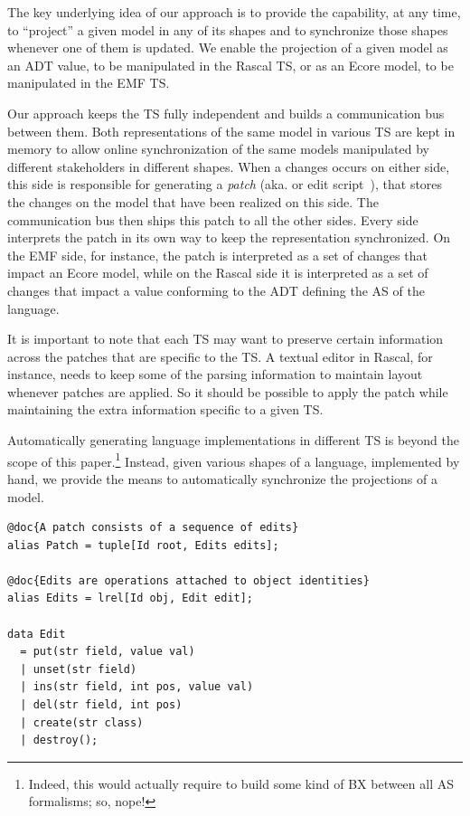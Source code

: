 The key underlying idea of our approach is to provide the capability, at any time, to ``project'' a given model in any of its shapes and to synchronize those shapes whenever one of them is updated.
We enable the projection of a given model as an ADT value, to be manipulated in the Rascal TS, or as an Ecore model, to be manipulated in the EMF TS.

Our approach keeps the TS fully independent and builds a communication bus between them.
Both representations of the same model in various TS are kept in memory to allow online synchronization of the same models manipulated by different stakeholders in different shapes.
When a changes occurs on either side, this side is responsible for generating a \emph{patch} (aka. \de or edit script~\cite{rozen2017towards}), that stores the changes on the model that have been realized on this side.
The communication bus then ships this patch to all the other sides.
Every side interprets the patch in its own way to keep the representation synchronized.
On the EMF side, for instance, the patch is interpreted as a set of changes that impact an Ecore model, while on the Rascal side it is interpreted as a set of changes that impact a value conforming to the ADT defining the AS of the language.

It is important to note that each TS may want to preserve certain information across the patches that are specific to the TS.
A textual editor in Rascal, for instance, needs to keep some of the parsing information to maintain layout whenever patches are applied.
So it should be possible to apply the patch while maintaining the extra information specific to a given TS.

Automatically generating language implementations in different TS is beyond the scope of this paper.\footnote{Indeed, this would actually require to build some kind of BX between all AS formalisms; so, nope!} Instead, given various shapes of a language, implemented by hand, we provide the means to automatically synchronize the projections of a model.

\begin{lstlisting}[label=lst:delta-adt, caption={CRUD-like \ds structure definition in Rascal}, language=Rascal]
@doc{A patch consists of a sequence of edits}
alias Patch = tuple[Id root, Edits edits];

@doc{Edits are operations attached to object identities}
alias Edits = lrel[Id obj, Edit edit];

data Edit
  = put(str field, value val)
  | unset(str field)
  | ins(str field, int pos, value val)
  | del(str field, int pos)
  | create(str class) 
  | destroy();
\end{lstlisting}


